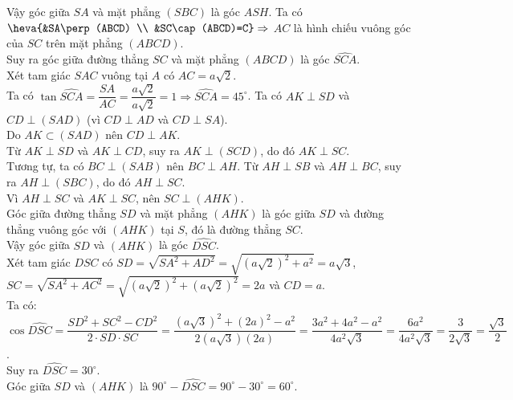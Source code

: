 \begin{ex}
{\begin{itemchoice}
			 Vậy góc giữa $SA$ và mặt phẳng $(SBC)$ là góc $\widehat{ASH}$.
			 \itemch
			Ta có $\heva{&SA\perp (ABCD)  \\
			&SC\cap (ABCD)=C} \Rightarrow$ $AC$ là hình chiếu vuông góc của $SC$  trên mặt phẳng $(ABCD)$. \\
			Suy ra góc giữa đường thẳng  $SC$ và mặt phẳng $(ABCD)$ là góc $\widehat{SCA}$. \\
			 Xét tam giác $SAC$ vuông tại $A$ có $AC=a\sqrt{2}$. \\
			Ta có  $\tan \widehat{SCA}=\dfrac{SA}{AC}=\dfrac{a\sqrt{2}}{a\sqrt{2}}=1\Rightarrow \widehat{SCA}=45^\circ$.
			\itemch 
			Ta có $AK\perp SD$ và $CD\perp (SAD)$ (vì $CD\perp AD$ và $CD\perp  SA$). \\
			Do $AK\subset  (SAD)$ nên $CD\perp AK$. \\
			Từ $AK\perp SD$  và $AK\perp CD$, suy ra $AK\perp (SCD)$, do đó $AK\perp SC$. \\
			Tương tự, ta có $BC\perp (SAB)$ nên $BC\perp AH$.  Từ $AH\perp SB$ và $AH\perp BC$, suy ra $AH\perp (SBC)$, do đó $AH\perp SC$. \\
			Vì  $AH\perp SC$ và $AK\perp SC$, nên $SC\perp (AHK)$. \\
			Góc giữa đường thẳng $SD$ và mặt  phẳng $(AHK)$ là góc giữa $SD$ và đường thẳng vuông góc với $(AHK)$ tại $S$, đó là đường thẳng $SC$. \\
			Vậy góc  giữa $SD$ và $(AHK)$ là góc $\widehat{DSC}$. \\
			Xét tam giác $DSC$ có $SD=\sqrt{SA^2+AD^2}=\sqrt{(a\sqrt{2})^2+a^2}=a\sqrt{3}$, $SC=\sqrt{SA^2+AC^2}=\sqrt{(a\sqrt{2})^2+(a\sqrt{2})^2}=2a$ và $CD=a$.  \\
			Ta  có:\\
			$\cos\widehat{DSC}=\dfrac{SD^2+SC^2-CD^2}{2\cdot SD\cdot SC}=\dfrac{(a\sqrt{3})^2+(2a)^2-a^2}{2(a\sqrt{3})(2a)}=\dfrac{3a^2+4a^2-a^2}{4a^2\sqrt{3}}=\dfrac{6a^2}{4a^2\sqrt{3}}=\dfrac{3}{2\sqrt{3}}=\dfrac{\sqrt{3}}{2}$. \\ 
			Suy ra $\widehat{DSC}=30^\circ$.  \\
			Góc giữa $SD$  và $(AHK)$ là $90^\circ-\widehat{DSC}=90^\circ-30^\circ=60^\circ$.
		\end{itemchoice}
	} 
\end{ex}

